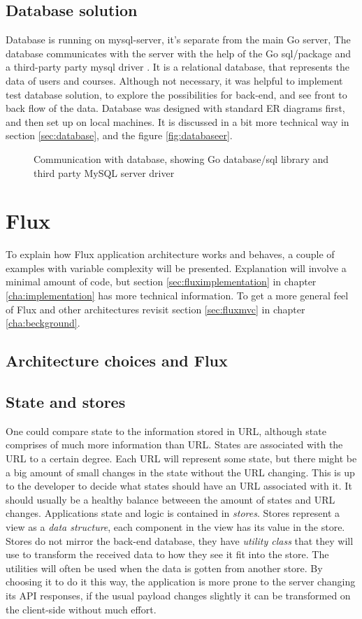 \subsection{Database solution}
Database is running on mysql-server, it's separate from the main Go server, The database communicates with the server with the help of the Go sql/package and a third-party party mysql driver \cite{ziutek}. It is a relational database, that represents the data of users and courses. Although not necessary, it was helpful to implement test database solution, to explore the possibilities for back-end, and see front to back flow of the data. Database was designed with standard ER diagrams first, and then set up on local machines.
It is discussed in a bit more technical way in section \ref{sec:database}, and the figure \ref{fig:databaseer}.
\begin{figure}[h]
  \scalebox{1}{}
  \caption{Communication with database, showing Go database/sql library and third party MySQL server driver \cite{ziutekdriver}}
  \label{fig:databaseoverview}
\end{figure}
\section{Flux}
To explain how Flux application architecture works and behaves, a couple of examples with variable complexity will be presented. Explanation will involve a minimal amount of code, but section \ref{sec:fluximplementation} in chapter \ref{cha:implementation} has more technical information. To get a more general feel of Flux and other architectures revisit section \ref{sec:fluxmvc} in chapter \ref{cha:beckground}.

\subsection{Architecture choices and Flux}

\subsection*{State and stores}
One could compare state to the information stored in URL, although state comprises of much more information than URL. States are associated with the URL to a certain degree. Each URL will represent some state, but there might be a big amount of small changes in the state without the URL changing. This is up to the developer to decide what states should have an URL associated with it. It should usually be a healthy balance betweeen the amount of states and URL changes.
Applications state and logic is contained in \emph{stores}. Stores represent a view as a \emph{data structure}, each component in the view has its value in the store. Stores do not mirror the back-end database, they have \emph{utility class} that they will use to transform the received data to how they see it fit into the store. The utilities will often be used when the data is gotten from another store. By choosing it to do it this way, the application is more prone to the server changing its API responses, if the usual payload changes slightly it can be transformed on the client-side without much effort.

